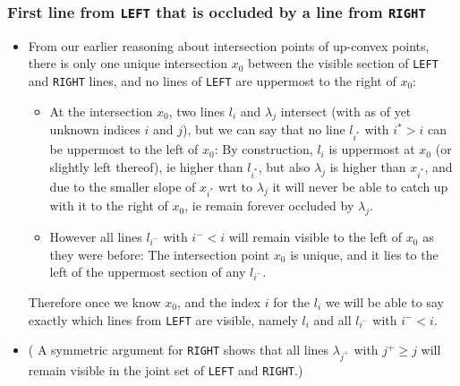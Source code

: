 \documentclass{article}
\begin{document}
\begin{frame}
  \frametitle{First line from \texttt{LEFT} that is occluded by a line
  from \texttt{RIGHT}}

\begin{itemize}
\item From our earlier reasoning about intersection points of up-convex
  points, there is only one unique intersection $x_0$ between the visible section
  of \texttt{LEFT} and \texttt{RIGHT} lines, and no lines of
  \texttt{LEFT} are uppermost to the right of $x_0$:
  \begin{itemize}
  \item At the intersection $x_0$, two lines $l_i$ and $\lambda_j$
    intersect (with as of yet unknown indices $i$ and $j$), but we can
    say that no line $l_{i^*}$ with $i^* > i$ can be uppermost to the
    left of $x_0$: By construction, $l_i$ is uppermost at $x_0$ (or
    slightly left thereof), ie
    higher than $l_{i^*}$, but also $\lambda_j$ is higher than $x_{i^*}$,
    and due to the smaller slope of $x_{i^*}$ wrt to $\lambda_j$ it
    will never be able to catch up with it to the right of $x_0$, ie
    remain forever occluded by $\lambda_j$.
  \item However all lines $l_{i^-}$ with $i^- < i$ will remain visible
    to the left of $x_0$ as they were before: The intersection point
    $x_0$ is unique, and it lies to the left of the uppermost section
    of any $l_{i^-}$. 
  \end{itemize}
  Therefore once we know $x_0$, and the index $i$ for the $l_i$ we
  will be able to say exactly which lines from \texttt{LEFT} are
  visible, namely $l_i$ and all $l_{i^-}$ with $i^- < i$. 
\item ( A symmetric argument for \texttt{RIGHT} shows that all lines
  $\lambda_{j^+}$ with $j^+ \geq j$ will remain visible in the joint
  set of \texttt{LEFT} and \texttt{RIGHT}.)
\end{itemize}

\end{frame}
\end{document}
